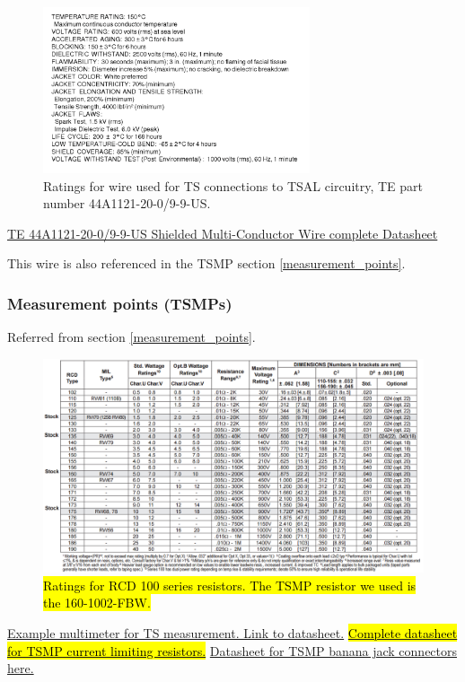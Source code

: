 \documentclass{article}
\begin{document}
\begin{figure}[H]
    \includegraphics[width=0.7\textwidth]{44A1121_wire_datasheet.png}
    \caption{Ratings for wire used for TS connections to TSAL circuitry, TE part number 44A1121-20-0/9-9-US.}
    \label{fig:HV_low_current_wire_ratings}
\end{figure}
\href{http://www.mouser.com/ds/2/418/NG_CD_44A112X_G1-689824.pdf}{TE 44A1121-20-0/9-9-US Shielded Multi-Conductor Wire complete Datasheet}

This wire is also referenced in the TSMP section \ref{measurement_points}.

\subsubsection{Measurement points (TSMPs)}\label{sec:appendix_TSMP}
Referred from section \ref{measurement_points}.

\begin{figure}[H]
	\centering
	\includegraphics[width=\linewidth]{TSMP_resistor_ratings}
	\caption{\hl{Ratings for RCD 100 series resistors. The TSMP resistor we used is the 160-1002-FBW.}}
\end{figure}
\href{https://www.gossenmetrawatt.com/resources/tt/hit27/db_gb.pdf}{Example multimeter for TS measurement. Link to datasheet.}
\href{http://www.farnell.com/datasheets/1697085.pdf}{\hl{Complete datasheet for TSMP current limiting resistors.}}
\href{http://www.mouser.com/ds/2/159/D72930_02_10_06-21562.pdf}{Datasheet for TSMP banana jack connectors here.}
\end{document}

